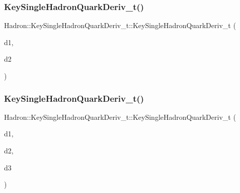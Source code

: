 \subsubsection{\texorpdfstring{KeySingleHadronQuarkDeriv\_t()}{KeySingleHadronQuarkDeriv\_t()}\hspace{0.1cm}{\footnotesize\ttfamily [8/10]}}
{\footnotesize\ttfamily Hadron\+::\+Key\+Single\+Hadron\+Quark\+Deriv\+\_\+t\+::\+Key\+Single\+Hadron\+Quark\+Deriv\+\_\+t (\begin{DoxyParamCaption}\item[{const \mbox{\hyperlink{structHadron_1_1SingleHadronQuarkDeriv__t}{Single\+Hadron\+Quark\+Deriv\+\_\+t}} \&}]{d1,  }\item[{const \mbox{\hyperlink{structHadron_1_1SingleHadronQuarkDeriv__t}{Single\+Hadron\+Quark\+Deriv\+\_\+t}} \&}]{d2 }\end{DoxyParamCaption})\hspace{0.3cm}{\ttfamily [inline]}}

\mbox{\label{structHadron_1_1KeySingleHadronQuarkDeriv__t_a228d03db64fbe8db5371d92e4fb3806e}} 
\subsubsection{\texorpdfstring{KeySingleHadronQuarkDeriv\_t()}{KeySingleHadronQuarkDeriv\_t()}\hspace{0.1cm}{\footnotesize\ttfamily [9/10]}}
{\footnotesize\ttfamily Hadron\+::\+Key\+Single\+Hadron\+Quark\+Deriv\+\_\+t\+::\+Key\+Single\+Hadron\+Quark\+Deriv\+\_\+t (\begin{DoxyParamCaption}\item[{const \mbox{\hyperlink{structHadron_1_1SingleHadronQuarkDeriv__t}{Single\+Hadron\+Quark\+Deriv\+\_\+t}} \&}]{d1,  }\item[{const \mbox{\hyperlink{structHadron_1_1SingleHadronQuarkDeriv__t}{Single\+Hadron\+Quark\+Deriv\+\_\+t}} \&}]{d2,  }\item[{const \mbox{\hyperlink{structHadron_1_1SingleHadronQuarkDeriv__t}{Single\+Hadron\+Quark\+Deriv\+\_\+t}} \&}]{d3 }\end{DoxyParamCaption})\hspace{0.3cm}{\ttfamily [inline]}}

